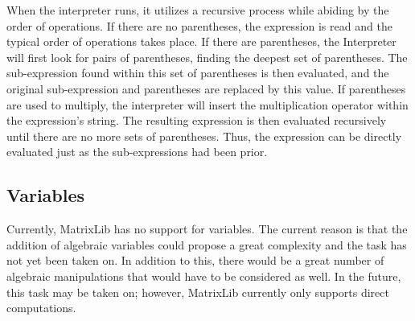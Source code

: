 When the interpreter runs, it utilizes a recursive process while abiding by the order of operations.
If there are no parentheses, the expression is read and the typical order of operations takes place.
If there are parentheses, the Interpreter will first look for pairs of parentheses, finding the deepest set of parentheses.
The sub-expression found within this set of parentheses is then evaluated, and the original sub-expression and parentheses are replaced by this value.
If parentheses are used to multiply, the interpreter will insert the multiplication operator within the expression's string.
The resulting expression is then evaluated recursively until there are no more sets of parentheses.
Thus, the expression can be directly evaluated just as the sub-expressions had been prior.

\subsection*{Variables}
Currently, MatrixLib has no support for variables.
The current reason is that the addition of algebraic variables could propose a great complexity and the task has not yet been taken on.
In addition to this, there would be a great number of algebraic manipulations that would have to be considered as well.
In the future, this task may be taken on; however, MatrixLib currently only supports direct computations.